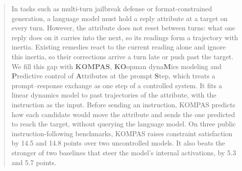 \begin{abstract}
In tasks such as multi-turn jailbreak defense or format-constrained generation, a language model must hold a reply attribute at a target on every turn.
However, the attribute does not reset between turns: what one reply does on it carries into the next, so its readings form a trajectory with inertia.
Existing remedies react to the current reading alone and ignore this inertia, so their corrections arrive a turn late or push past the target.
We fill this gap with \textbf{KOMPAS}, \textbf{KO}opman dyna\textbf{M}ics modeling and \textbf{P}redictive control of \textbf{A}ttributes at the prompt \textbf{S}tep, which treats a prompt--response exchange as one step of a controlled system.
It fits a linear dynamics model to past trajectories of the attribute, with the instruction as the input.
Before sending an instruction, KOMPAS predicts how each candidate would move the attribute and sends the one predicted to reach the target, without querying the language model.
On three public instruction-following benchmarks, KOMPAS raises constraint satisfaction by 14.5 and 14.8 points over two uncontrolled models.  %
It also beats the stronger of two baselines that steer the model's internal activations, by 5.3 and 5.7 points.  %
\end{abstract}
